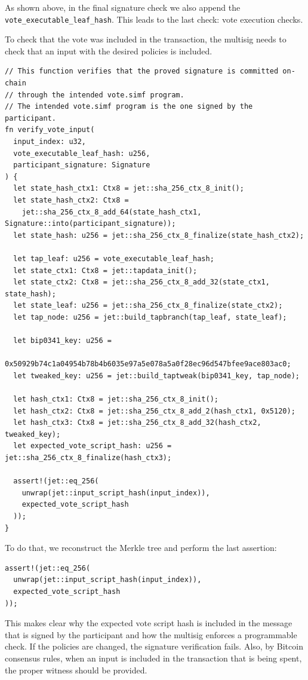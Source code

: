 \documentclass[11pt]{article}
\begin{document}
    As shown above, in the final signature check we also append the
    \texttt{vote\_executable\_leaf\_hash}. This leads to the last check: vote execution checks.

    To check that the vote was included in the transaction, the multisig needs to check that an input with the desired policies is included.

    \begin{lstlisting}
// This function verifies that the proved signature is committed on-chain
// through the intended vote.simf program.
// The intended vote.simf program is the one signed by the participant.
fn verify_vote_input(
  input_index: u32,
  vote_executable_leaf_hash: u256,
  participant_signature: Signature
) {
  let state_hash_ctx1: Ctx8 = jet::sha_256_ctx_8_init();
  let state_hash_ctx2: Ctx8 =
    jet::sha_256_ctx_8_add_64(state_hash_ctx1, Signature::into(participant_signature));
  let state_hash: u256 = jet::sha_256_ctx_8_finalize(state_hash_ctx2);

  let tap_leaf: u256 = vote_executable_leaf_hash;
  let state_ctx1: Ctx8 = jet::tapdata_init();
  let state_ctx2: Ctx8 = jet::sha_256_ctx_8_add_32(state_ctx1, state_hash);
  let state_leaf: u256 = jet::sha_256_ctx_8_finalize(state_ctx2);
  let tap_node: u256 = jet::build_tapbranch(tap_leaf, state_leaf);

  let bip0341_key: u256 =
    0x50929b74c1a04954b78b4b6035e97a5e078a5a0f28ec96d547bfee9ace803ac0;
  let tweaked_key: u256 = jet::build_taptweak(bip0341_key, tap_node);

  let hash_ctx1: Ctx8 = jet::sha_256_ctx_8_init();
  let hash_ctx2: Ctx8 = jet::sha_256_ctx_8_add_2(hash_ctx1, 0x5120);
  let hash_ctx3: Ctx8 = jet::sha_256_ctx_8_add_32(hash_ctx2, tweaked_key);
  let expected_vote_script_hash: u256 = jet::sha_256_ctx_8_finalize(hash_ctx3);

  assert!(jet::eq_256(
    unwrap(jet::input_script_hash(input_index)),
    expected_vote_script_hash
  ));
}
    \end{lstlisting}

    To do that, we reconstruct the Merkle tree and perform the last assertion:

    \begin{lstlisting}
assert!(jet::eq_256(
  unwrap(jet::input_script_hash(input_index)),
  expected_vote_script_hash
));
    \end{lstlisting}

    This makes clear why the expected vote script hash is included in the message that is signed by the participant and how the multisig enforces a programmable check. If the policies are changed, the signature verification fails. Also, by Bitcoin consensus rules, when an input is included in the transaction that is being spent, the proper witness should be provided.
\end{document}
